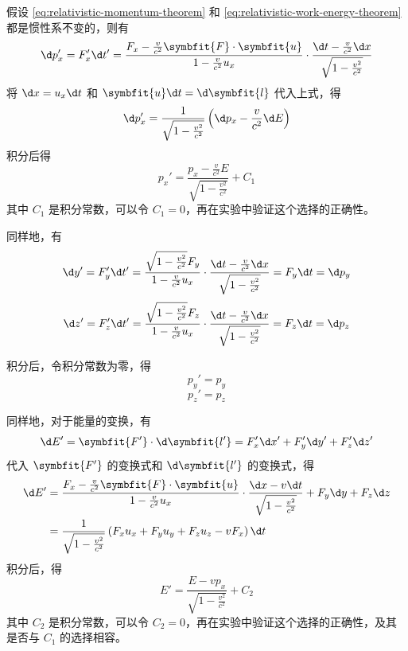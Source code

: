 假设 \cref{eq:relativistic-momentum-theorem} 和 \cref{eq:relativistic-work-energy-theorem} 都是惯性系不变的，则有
\begin{equation}
    \d p_x' = F_x' \d t' = \frac{F_x - \frac{v}{c^2} \symbfit{F} \cdot \symbfit{u}}{1 - \frac{v}{c^2} u_x} \cdot \frac{\d t - \frac{v}{c^2} \d x}{\sqrt{1 - \frac{v^2}{c^2}}}
\end{equation}
将 $\d x = u_x \d t$ 和 $\symbfit{u} \d t = \d \symbfit{l}$ 代入上式，得
\begin{equation}
    \d p_x' = \frac{1}{\sqrt{1 - \frac{v^2}{c^2}}} \left( \d p_x - \frac{v}{c^2} \d E \right)
\end{equation}
积分后得
\begin{equation}
    p_x' = \frac{p_x - \frac{v}{c^2} E}{\sqrt{1 - \frac{v^2}{c^2}}} + C_1
\end{equation}
其中 $C_1$ 是积分常数，可以令 $C_1 = 0$，再在实验中验证这个选择的正确性。

同样地，有
\begin{equation}
    \d y' = F_y' \d t' = \frac{\sqrt{1 - \frac{v^2}{c^2}} F_y}{1 - \frac{v}{c^2} u_x} \cdot \frac{\d t - \frac{v}{c^2} \d x}{\sqrt{1 - \frac{v^2}{c^2}}} = F_y \d t = \d p_y
\end{equation}
\begin{equation}
    \d z' = F_z' \d t' = \frac{\sqrt{1 - \frac{v^2}{c^2}} F_z}{1 - \frac{v}{c^2} u_x} \cdot \frac{\d t - \frac{v}{c^2} \d x}{\sqrt{1 - \frac{v^2}{c^2}}} = F_z \d t = \d p_z
\end{equation}

积分后，令积分常数为零，得
\begin{equation}
    p_y' = p_y
\end{equation}
\begin{equation}
    p_z' = p_z
\end{equation}

同样地，对于能量的变换，有
\begin{equation}
    \d E' = \symbfit{F'} \cdot \d \symbfit{l'} = F_x' \d x' + F_y' \d y' + F_z' \d z'
\end{equation}
代入 $\symbfit{F'}$ 的变换式和 $\d \symbfit{l'}$ 的变换式，得
\begin{equation}
    \begin{aligned}
        \d E' & = \frac{F_x - \frac{v}{c^2} \symbfit{F} \cdot \symbfit{u}}{1 - \frac{v}{c^2} u_x} \cdot \frac{\d x - v \d t}{\sqrt{1 - \frac{v^2}{c^2}}} + F_y \d y + F_z \d z \\
              & = \frac{1}{\sqrt{1 - \frac{v^2}{c^2}}} \left( F_x u_x + F_y u_y + F_z u_z - v F_x \right) \d t
    \end{aligned}
\end{equation}
积分后，得
\begin{equation}
    E' = \frac{E - v p_x}{\sqrt{1 - \frac{v^2}{c^2}}} + C_2
\end{equation}
其中 $C_2$ 是积分常数，可以令 $C_2 = 0$，再在实验中验证这个选择的正确性，及其是否与 $C_1$ 的选择相容。

